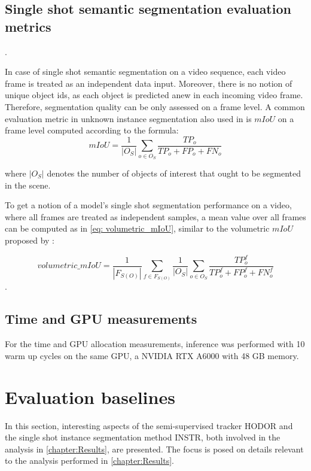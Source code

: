 \subsection{Single shot semantic segmentation evaluation metrics}.

In case of single shot semantic segmentation on a video sequence, each video frame is treated as an independent data input. Moreover, there is no notion of unique object ids, as each object is predicted anew in each incoming video frame. Therefore, segmentation quality can be only assessed on a frame level. A common evaluation metric in unknown instance segmentation also used in \parencite{durner2021unknown} is $mIoU$ on a frame level computed according to the formula:
\begin{equation}
    \label{eq: mIoU}
    mIoU = \frac{1}{|O_S|} \sum_{o \in O_S} \frac{TP_o}{TP_o+FP_o+FN_o}
\end{equation}

where $|O_S|$ denotes the number of objects of interest that ought to be segmented in the scene.

To get a notion of a model's single shot segmentation performance on a video, where all frames are treated as independent samples, a mean value over all frames can be computed as in \eqref{eq: volumetric_mIoU}, similar to the volumetric $mIoU$ proposed by \cite{Rovis}:

\begin{equation}
    \label{eq: volumetric_mIoU}
    volumetric\_mIoU =  \frac{1}{|F_{S(O)}|} \sum_{f \in F_{S(O)}}  \frac{1}{|O_S|} \sum_{o \in O_S} \frac{TP_o^f}{TP_o^f+FP_o^f+FN_o^f}
\end{equation}.



\subsection{Time and GPU measurements}

For the time and GPU allocation measurements, inference was performed with 10 warm up cycles on the same GPU, a NVIDIA RTX A6000 with 48 GB memory.


\section{Evaluation baselines}

In this section, interesting aspects of the semi-supervised tracker HODOR \parencite{athar2022hodor} and the single shot instance segmentation method INSTR, both involved in the analysis in \autoref{chapter:Results}, are presented. The focus is posed on details relevant to the analysis performed in \autoref{chapter:Results}.

